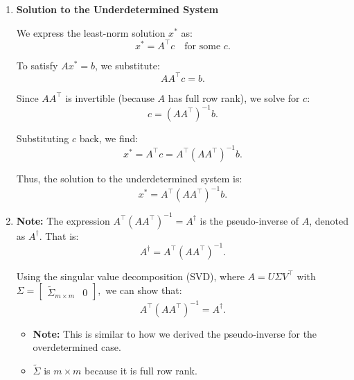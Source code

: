 \begin{derivation}
\begin{enumerate}
        \item \textbf{Solution to the Underdetermined System}

        We express the least-norm solution \(x^*\) as:
        \[
        x^* = A^\top c \quad \text{for some } c.
        \]

        To satisfy \(A x^* = b\), we substitute:
        \[
        A A^\top c = b.
        \]

        Since \(A A^\top\) is invertible (because \(A\) has full row rank), we solve for \(c\):
        \[
        c = (A A^\top)^{-1} b.
        \]

        Substituting \(c\) back, we find:
        \[
        x^* = A^\top c = A^\top (A A^\top)^{-1} b.
        \]

        Thus, the solution to the underdetermined system is:
        \[
        x^* = A^\top (A A^\top)^{-1} b.
        \]

        \item \textbf{Note:} The expression \(A^\top (A A^\top)^{-1} = A^\dagger \) is the pseudo-inverse of \(A\), denoted as \(A^\dagger\). That is:
        \[
        A^\dagger = A^\top (A A^\top)^{-1}.
        \]

        Using the singular value decomposition (SVD), where \(A = U \Sigma V^\top\) with
        $
        \Sigma = 
        \begin{bmatrix}
        \tilde{\Sigma}_{m \times m} & 0
        \end{bmatrix},
        $
        we can show that:
        \[
        A^\top (A A^\top)^{-1} = A^\dagger.
        \]
        \begin{itemize}
            \item \textbf{Note:} This is similar to how we derived the pseudo-inverse for the overdetermined case.
            \item $\tilde{\Sigma}$ is $m \times m$ because it is full row rank. 
        \end{itemize}        
    \end{enumerate}
\end{derivation}

